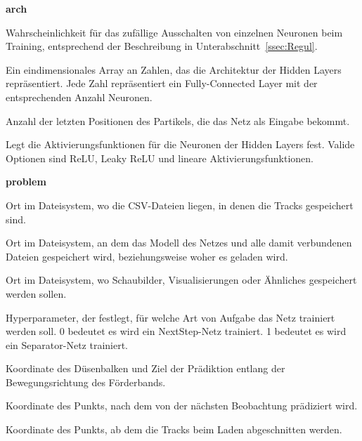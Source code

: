
\newpage
{\Large \sffamily \textbf{arch}}
\begin{description}[leftmargin=!,labelwidth=\widthof{\bfseries separatorPosition}, labelindent=0.5cm]
    \item [dropoutRate] Wahrscheinlichkeit für das zufällige Ausschalten von einzelnen Neuronen beim Training, entsprechend der Beschreibung in Unterabschnitt~\ref{ssec:Regul}.
    \item [hiddenLayers] Ein ein­di­men­si­o­nales Array an Zahlen, das die Architektur der Hidden Layers repräsentiert. Jede Zahl repräsentiert ein Fully-Connected Layer mit der entsprechenden Anzahl Neuronen.
    \item [featureSize] Anzahl der letzten Positionen des Partikels, die das Netz als Eingabe bekommt.
    \item [activation] Legt die Aktivierungsfunktionen für die Neuronen der Hidden Layers fest. Valide Optionen sind ReLU, Leaky ReLU und lineare Aktivierungsfunktionen.
\end{description}

\bigskip
{\Large \sffamily \textbf{problem}}

\begin{description}[leftmargin=!,labelwidth=\widthof{\bfseries separatorPosition}, labelindent=0.5cm]
    \item[dataPath] Ort im Dateisystem, wo die CSV-Dateien liegen, in denen die Tracks gespeichert sind.
    \item[modelBasePath] Ort im Dateisystem, an dem das Modell des Netzes und alle damit verbundenen Dateien gespeichert wird, beziehungsweise woher es geladen wird. 
    \item [imagePath] Ort im Dateisystem, wo Schaubilder, Visualisierungen oder Ähnliches gespeichert werden sollen.
    \item [separator] Hyperparameter, der festlegt, für welche Art von Aufgabe das Netz trainiert werden soll. 0 bedeutet es wird ein NextStep-Netz trainiert. 1 bedeutet es wird ein Separator-Netz trainiert.
\end{description}

\begin{description}[leftmargin=!,labelwidth=\widthof{\bfseries separatorPosition}, labelindent=0.5cm]
    \item[separatorPosition] Koordinate des Düsenbalken und Ziel der Prädiktion entlang der Bewegungsrichtung des Förderbands.
    \item[thresholdPoint] Koordinate des Punkts, nach dem von der nächsten Beobachtung prädiziert wird.
    \item[predictionCutOff] Koordinate des Punkts, ab dem die Tracks beim Laden abgeschnitten werden.
\end{description}

